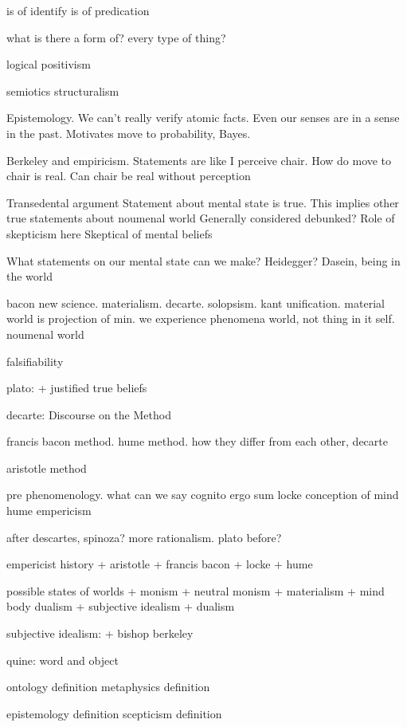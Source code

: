 is of identify
is of predication

what is there a form of? every type of thing?



logical positivism

semiotics
structuralism


Epistemology. We can't really verify atomic facts. Even our senses are in a sense in the past. Motivates move to probability, Bayes.


Berkeley and empiricism. Statements are like I perceive chair. How do move to chair is real. Can chair be real without perception


Transedental argument
Statement about mental state is true.
This implies other true statements about noumenal world
Generally considered debunked?
Role of skepticism here
Skeptical of mental beliefs


What statements on our mental state can we make?
Heidegger?
Dasein, being in the world




bacon new science. materialism.
decarte. solopsism.
kant unification. material world is projection of min. we experience phenomena world, not thing in it self. noumenal world



falsifiability

plato:
+ justified true beliefs



decarte: Discourse on the Method

francis bacon method. hume method. how they differ from each other, decarte

aristotle method



pre phenomenology. what can we say
cognito ergo sum
locke conception of mind
hume empericism

after descartes, spinoza? more rationalism.
plato before?

empericist history
+ aristotle
+ francis bacon
+ locke
+ hume

possible states of worlds
+ monism
+ neutral monism
+ materialism
+ mind body dualism
+ subjective idealism
+ dualism

subjective idealism:
+ bishop berkeley


quine: word and object


ontology definition
metaphysics definition

epistemology definition
scepticism definition

